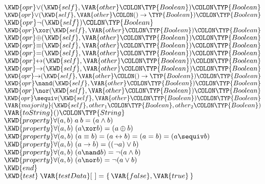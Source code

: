 \begin{Fortress}
\(  \KWD{opr} \mathord{\vee}(\KWD{self}, \VAR{other}\COLON \TYP{Boolean})\COLON \TYP{Boolean}\)\\
\(  \KWD{opr} \mathord{\vee}(\KWD{self}, \VAR{other}\COLON ()\rightarrow\TYP{Boolean})\COLON \TYP{Boolean}\)\\
\(  \KWD{opr} \mathord{\neg}(\KWD{self})\COLON \TYP{Boolean}\)\\
\(  \KWD{opr} \mathord{\xor}(\KWD{self}, \VAR{other}\COLON \TYP{Boolean})\COLON \TYP{Boolean}\)\\
\(  \KWD{opr} \mathord{\oplus}(\KWD{self}, \VAR{other}\COLON \TYP{Boolean})\COLON \TYP{Boolean}\)\\
\(  \KWD{opr} \mathord{\equiv}(\KWD{self}, \VAR{other}\COLON \TYP{Boolean})\COLON \TYP{Boolean}\)\\
\(  \KWD{opr} \mathord{=}(\KWD{self}, \VAR{other}\COLON \TYP{Boolean})\COLON \TYP{Boolean}\)\\
\(  \KWD{opr} \mathord{\leftrightarrow}(\KWD{self}, \VAR{other}\COLON \TYP{Boolean})\COLON \TYP{Boolean}\)\\
\(  \KWD{opr} \mathord{\rightarrow}(\KWD{self}, \VAR{other}\COLON \TYP{Boolean})\COLON \TYP{Boolean}\)\\
\(  \KWD{opr} \mathord{\rightarrow}(\KWD{self}, \VAR{other}\COLON ()\rightarrow\TYP{Boolean})\COLON \TYP{Boolean}\)\\
\(  \KWD{opr} \mathord{\nand}(\KWD{self}, \VAR{other}\COLON \TYP{Boolean})\COLON  \TYP{Boolean}\)\\
\(  \KWD{opr} \mathord{\nor}(\KWD{self}, \VAR{other}\COLON \TYP{Boolean})\COLON  \TYP{Boolean}\)\\
\(  \KWD{opr} \mathord{\sequiv}(\KWD{self}, \VAR{other}\COLON \TYP{Boolean})\COLON \TYP{Boolean}\)\\
\(  \VAR{majority}(\KWD{self}, {other}_{1}\COLON \TYP{Boolean}, {other}_{2}\COLON \TYP{Boolean})\)\\
\(  \VAR{toString}()\COLON \TYP{String}\)\\
\(  \KWD{property} \forall (a, b)\; a\:b = (a \wedge b)\)\\
\(  \KWD{property} \forall (a, b)\; (a \xor b) = (a \oplus b)\)\\
\(  \KWD{property} \forall (a, b)\; (a \equiv b) = (a \leftrightarrow b) = (a = b) = (a \sequiv b)\)\\
\(  \KWD{property} \forall (a, b)\; (a \rightarrow b) = ((\neg a) \vee b)\)\\
\(  \KWD{property} \forall (a, b)\; (a \nand b) = \neg (a \wedge b)\)\\
\(  \KWD{property} \forall (a, b)\; (a \nor b) = \neg (a \vee b)\)\-\\\poptabs
\(\KWD{end}\)\\
\(\KWD{test}\:\VAR{testData}[~] = \{\,\VAR{false}, \VAR{true}\,\}\)
\end{Fortress}



